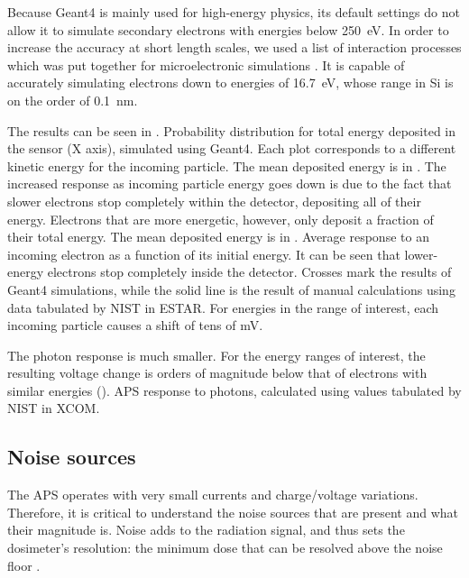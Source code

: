 Because Geant4 is mainly used for high-energy physics,
its default settings do not allow it to simulate secondary electrons with 
energies below \SI{250}{\electronvolt}.
In order to increase the accuracy at short length scales,
we used a list of interaction processes
which was put together for microelectronic simulations
\cite{Raine201497}.
It is capable of accurately simulating electrons down to energies of
\SI{16.7}{\electronvolt},
whose range in Si is on the order of \SI{0.1}{\nano\meter}.

The results can be seen in .
{Probability distribution for total energy deposited in the sensor (X axis),
simulated using Geant4.
Each plot corresponds to a different kinetic energy for the incoming particle.
The mean deposited energy is in .}
The increased response as incoming particle energy goes down
is due to the fact that slower electrons stop completely within the detector,
depositing all of their energy.
Electrons that are more energetic, however, only deposit a fraction of their total energy.
The mean deposited energy is in .
{Average response to an incoming electron
as a function of its initial energy.
It can be seen that lower-energy electrons stop completely inside the detector.
Crosses mark the results of Geant4 simulations,
while the solid line is the result of manual calculations using
data tabulated by NIST in ESTAR\cite{berger_estar_????}.}
For energies in the range of interest,
each incoming particle causes a shift of tens of mV.

The photon response is much smaller.
For the energy ranges of interest,
the resulting voltage change
is orders of magnitude below that of electrons with similar energies
().
{APS response to photons, calculated using values tabulated by NIST in XCOM\cite{suplee_xcom_2009}.}
\subsection{Noise sources}
The APS operates with very small currents and charge/voltage variations.
Therefore, it is critical to understand the noise sources that are present
and what their magnitude is.
Noise adds to the radiation signal,
and thus sets the dosimeter's resolution:
the minimum dose that can be resolved
above the noise floor
\cite{taylor_introduction_1997}.
